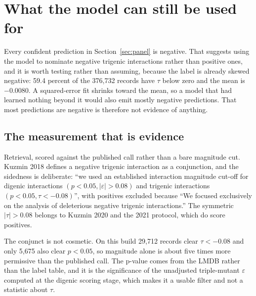 
\section{What the model can still be used for}
\label{sec:negatives}

Every confident prediction in Section~\ref{sec:panel} is negative. That suggests
using the model to nominate negative trigenic interactions rather than positive
ones, and it is worth testing rather than assuming, because the label is already
skewed negative: 59.4 percent of the 376{,}732 records have $\tau$ below zero and
the mean is $-0.0080$. A squared-error fit shrinks toward the mean, so a model
that had learned nothing beyond it would also emit mostly negative predictions.
That most predictions are negative is therefore not evidence of anything.

\subsection{The measurement that is evidence}

Retrieval, scored against the published call rather than a bare magnitude cut.
Kuzmin 2018 defines a negative trigenic interaction as a conjunction, and the
sidedness is deliberate: ``we used an established interaction magnitude cut-off
for digenic interactions $(p < 0.05, |\varepsilon| > 0.08)$ and trigenic
interactions $(p < 0.05, \tau < -0.08)$'', with positives excluded because
``We focused exclusively on the analysis of deleterious negative trigenic
interactions.'' The symmetric $|\tau| > 0.08$ belongs to Kuzmin 2020 and the 2021
protocol, which do score positives.

The conjunct is not cosmetic. On this build 29{,}712 records clear
$\tau < -0.08$ and only 5{,}675 also clear $p < 0.05$, so magnitude alone is
about five times more permissive than the published call. The p-value comes from
the LMDB rather than the label table, and it is the significance of the
unadjusted triple-mutant $\varepsilon$ computed at the digenic scoring stage,
which makes it a usable filter and not a statistic about $\tau$.

